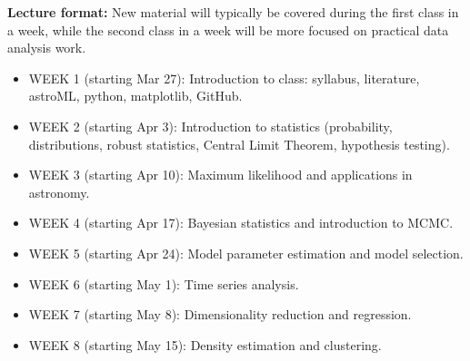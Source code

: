 \documentclass[10pt]{article}
\begin{document}
{\bf Lecture format:}
New material will typically be covered during the first class in a week, while
the second class in a week will be more focused on practical data analysis work. 

\newpage 
\begin{itemize}
\item WEEK 1 (starting Mar 27): 
      Introduction to class: syllabus, literature, astroML, python, matplotlib, GitHub. 
\item WEEK  2 (starting Apr 3): Introduction to statistics (probability, distributions, 
             robust statistics, Central Limit Theorem,  hypothesis testing).
\item WEEK  3 (starting Apr 10):  Maximum likelihood and applications in astronomy.
\item WEEK  4 (starting Apr 17):  Bayesian statistics and introduction to MCMC.
\item WEEK  5 (starting Apr 24):  Model parameter estimation and model selection.

\item WEEK  6 (starting May 1):   Time series analysis.

\item WEEK  7 (starting May 8): Dimensionality reduction and regression.

\item WEEK  8 (starting May 15):  Density estimation and clustering.
%
% 


\end{itemize}
\end{document}
